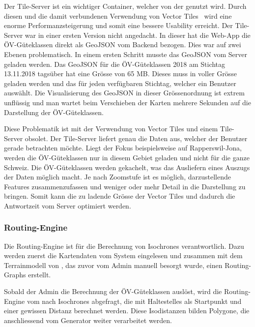 Der Tile-Server ist ein wichtiger Container, welcher von der  genutzt wird.
Durch diesen und die damit verbundenen Verwendung von Vector Tiles~\cite{geometalab_vectortiles} wird eine enorme Performanzsteigerung und somit eine bessere Usability erreicht.
Der Tile-Server war in einer ersten Version nicht angedacht.
In dieser hat die Web-App die \gls{ÖV-Güteklassen} direkt als \gls{GeoJSON} vom Backend bezogen.
Dies war auf zwei Ebenen problematisch.
In einem ersten Schritt musste das \gls{GeoJSON} vom Server geladen werden.
Das \gls{GeoJSON} für die \gls{ÖV-Güteklassen} 2018 am Stichtag 13.11.2018 tagsüber hat eine Grösse von 65 MB.
Dieses muss in voller Grösse geladen werden und das für jeden verfügbaren Stichtag, welcher ein Benutzer auswählt.
Die Visualisierung des \gls{GeoJSON} in dieser Grössenordnung ist extrem unflüssig und man wartet beim Verschieben der Karten mehrere Sekunden auf die Darstellung der \gls{ÖV-Güteklassen}.

Diese Problematik ist mit der Verwendung von Vector Tiles und einem Tile-Server obsolet.
Der Tile-Server liefert genau die Daten aus, welcher der Benutzer gerade betrachten möchte.
Liegt der Fokus beispielsweise auf Rapperswil-Jona, werden die \gls{ÖV-Güteklassen} nur in diesem Gebiet geladen und nicht für die ganze Schweiz.
Die \gls{ÖV-Güteklassen} werden gekachelt, was das Ausliefern eines Auszugs der Daten möglich macht.
Je nach Zoomstufe ist es möglich, darzustellende Features zusammenzufassen und weniger oder mehr Detail in die Darstellung zu bringen. Somit kann die zu ladende Grösse der Vector Tiles und dadurch die Antwortzeit vom Server optimiert werden.

\subsubsection{Routing-Engine}
\label{container:Routing-Engine}

Die \gls{Routing-Engine} ist für die Berechnung von \glspl{Isochrone} verantwortlich.
Dazu werden zuerst die Kartendaten vom System  eingelesen und zusammen mit dem \gls{Terrainmodell} von , das zuvor vom Admin manuell besorgt wurde, einen \glspl{Routing-Graph} erstellt.

Sobald der Admin die Berechnung der ÖV-Güteklassen auslöst, wird die \gls{Routing-Engine} vom  nach \glspl{Isochrone} abgefragt, die mit \glspl{Haltestelle} als Startpunkt und einer gewissen Distanz berechnet werden.
Diese Isodistanzen bilden Polygone, die anschliessend vom Generator weiter verarbeitet werden.
